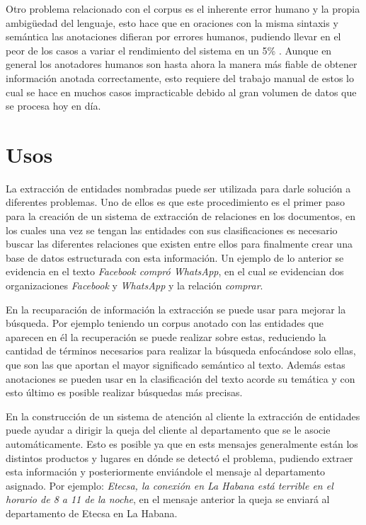 \documentclass[runningheads]{llncs}
\begin{document}
Otro problema relacionado con el corpus es el inherente error humano y la propia ambigüedad del lenguaje, esto hace que en oraciones con la misma sintaxis y semántica las anotaciones difieran por errores humanos, pudiendo llevar en el peor de los casos a variar el rendimiento del sistema en un 5\% \cite{posdecisiontree}. Aunque en general los anotadores humanos son hasta ahora la manera más fiable de obtener información anotada correctamente, esto requiere del trabajo manual de estos lo cual se hace en muchos casos impracticable debido al gran volumen de datos que se procesa hoy en día.

\section{Usos}

La extracción de entidades nombradas puede ser utilizada para darle solución a diferentes problemas. Uno de ellos es que este procedimiento es el primer paso para la creación de un sistema de extracción de relaciones en los documentos, en los cuales una vez se tengan las entidades con sus clasificaciones es necesario buscar las diferentes relaciones que existen entre ellos para finalmente crear una base de datos estructurada con esta información. Un ejemplo de lo anterior se evidencia en el texto \emph{Facebook compró WhatsApp}, en el cual se evidencian dos organizaciones \emph{Facebook} y \emph{WhatsApp} y la relación \emph{comprar}.

En la recuparación de información la extracción se puede usar para mejorar la búsqueda. Por ejemplo teniendo un corpus anotado con las entidades que aparecen en él la recuperación se puede realizar sobre estas, reduciendo la cantidad de términos necesarios para realizar la búsqueda enfocándose solo ellas, que son las que aportan el mayor significado semántico al texto. Además estas anotaciones se pueden usar en la clasificación del texto acorde su temática y con esto último es posible realizar búsquedas más precisas.

En la construcción de un sistema de atención al cliente la extracción de entidades puede ayudar a dirigir la queja del cliente al departamento que se le asocie automáticamente. Esto es posible ya que en ests mensajes generalmente están los distintos productos y lugares en dónde se detectó el problema, pudiendo extraer esta información y posteriormente enviándole el mensaje al departamento asignado. Por ejemplo: \emph{Etecsa, la conexión en La Habana está terrible en el horario de 8 a 11 de la noche}, en el mensaje anterior la queja se enviará al departamento de Etecsa en La Habana.
\end{document}
